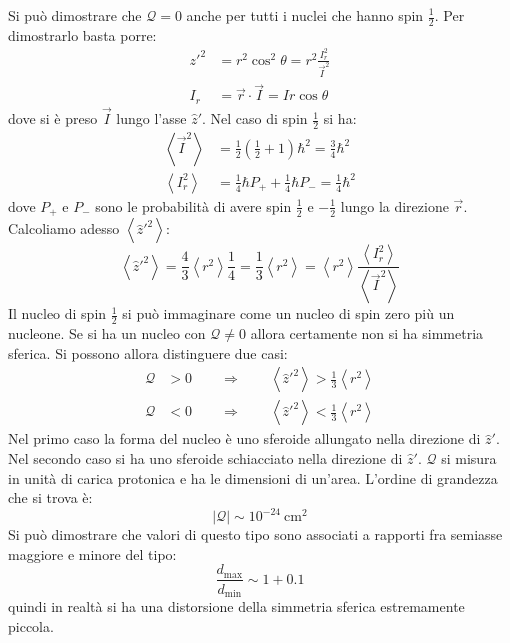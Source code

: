 Si  può dimostrare che $\mathcal{Q} = 0$ anche per tutti
i nuclei che hanno spin $\frac{1}{2}$. Per dimostrarlo basta porre:
\begin{equation}
\begin{split}
z'^2 &= r^2 \cos^2 \theta = r^2 \frac{I_r^2}{\vec{I}^2}\\
I_r &= \vec{r} \cdot \vec{I} = I r \cos \theta
\end{split}
\end{equation}
dove si è preso $\vec{I}$ lungo l'asse $\hat{z}'$. Nel caso di spin $\frac{1}{2}$ si ha:
\begin{equation}
\begin{split}
\left\langle \vec{I}^2 \right\rangle &= \frac{1}{2} \left( \frac{1}{2} + 1 \right) \hbar^2 = \frac{3}{4} \hbar^2\\
\left\langle I_r^2 \right\rangle &= \frac{1}{4} \hbar P_+ + \frac{1}{4} \hbar P_- = \frac{1}{4} \hbar ^2
\end{split}
\end{equation}
dove $P_+$ e $P_-$ sono le probabilità di avere spin $\frac{1}{2}$ e
$-\frac{1}{2}$ lungo la direzione $\vec{r}$. Calcoliamo adesso $\left\langle
\hat{z}'^2 \right\rangle$:
\begin{equation}
\left\langle \hat{z}'^2 \right\rangle  = \frac{4}{3} \left\langle r^2 \right\rangle \frac{1}{4} = \frac{1}{3} \left\langle r^2 \right\rangle = \left\langle r^2 \right\rangle \frac{\left\langle I_r^2 \right\rangle}{\left\langle \vec{I}^2 \right\rangle}
\end{equation}
Il nucleo di spin $\frac{1}{2}$ si può immaginare come un nucleo di spin zero
più un nucleone. Se si ha un nucleo con $\mathcal{Q} \ne 0$ allora certamente
non si ha simmetria sferica. Si possono allora distinguere due casi:
\begin{equation}
\begin{split}
\mathcal{Q} &> 0 \qquad \Rightarrow \qquad \left\langle \hat{z}'^2 \right\rangle > \frac{1}{3} \left\langle r^2 \right\rangle\\
\mathcal{Q} &< 0 \qquad \Rightarrow \qquad \left\langle \hat{z}'^2 \right\rangle < \frac{1}{3} \left\langle r^2 \right\rangle
\end{split}
\end{equation}
Nel primo caso la forma del nucleo è uno sferoide allungato nella direzione di
$\hat{z}'$. Nel secondo caso si ha uno sferoide schiacciato nella direzione di
$\hat{z}'$. $\mathcal{Q}$ si misura in unità di carica protonica e ha le
dimensioni di un'area. L'ordine di grandezza che si trova è:
\begin{equation}
\left| \mathcal{Q} \right| \sim 10^{-24}\ \text{cm}^2
\end{equation}
Si può dimostrare che valori di questo tipo sono associati a rapporti fra
semiasse maggiore e minore del tipo:
\begin{equation}
\frac{d_\text{max}}{d_\text{min}} \sim 1 + 0.1 
\end{equation}
quindi in realtà si ha una distorsione della simmetria sferica estremamente piccola.

